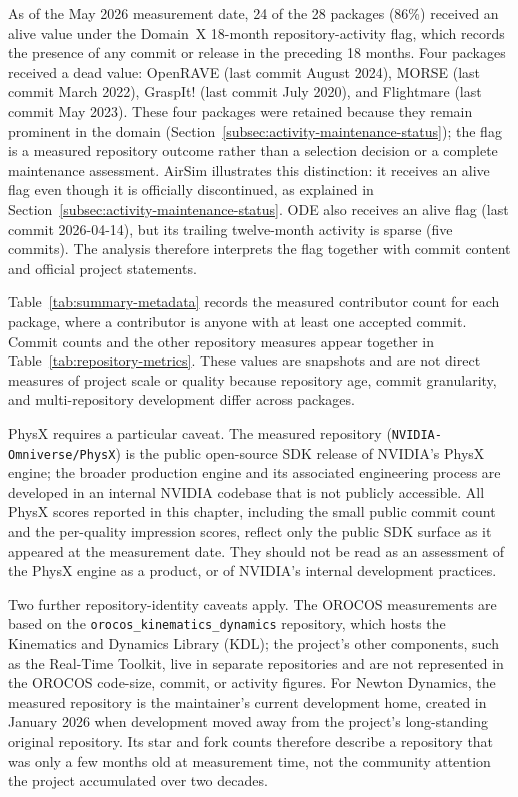 As of the May 2026 measurement date, 24 of the 28 packages (86\%) received an alive value under the Domain~X 18-month repository-activity flag, which records the presence of any commit or release in the preceding 18 months. Four packages received a dead value: OpenRAVE (last commit August 2024), MORSE (last commit March 2022), GraspIt! (last commit July 2020), and Flightmare (last commit May 2023). These four packages were retained because they remain prominent in the domain (Section~\ref{subsec:activity-maintenance-status}); the flag is a measured repository outcome rather than a selection decision or a complete maintenance assessment. AirSim illustrates this distinction: it receives an alive flag even though it is officially discontinued, as explained in Section~\ref{subsec:activity-maintenance-status}. ODE also receives an alive flag (last commit 2026-04-14), but its trailing twelve-month activity is sparse (five commits). The analysis therefore interprets the flag together with commit content and official project statements.

Table~\ref{tab:summary-metadata} records the measured contributor count for each package, where a contributor is anyone with at least one accepted commit. Commit counts and the other repository measures appear together in Table~\ref{tab:repository-metrics}. These values are snapshots and are not direct measures of project scale or quality because repository age, commit granularity, and multi-repository development differ across packages.

PhysX requires a particular caveat. The measured repository (\texttt{NVIDIA-\allowbreak Omniverse/\allowbreak PhysX}) is the public open-source SDK release of NVIDIA's PhysX engine; the broader production engine and its associated engineering process are developed in an internal NVIDIA codebase that is not publicly accessible. All PhysX scores reported in this chapter, including the small public commit count and the per-quality impression scores, reflect only the public SDK surface as it appeared at the measurement date. They should not be read as an assessment of the PhysX engine as a product, or of NVIDIA's internal development practices.

Two further repository-identity caveats apply. The OROCOS measurements are based on the \texttt{orocos\_kinematics\_dynamics} repository, which hosts the Kinematics and Dynamics Library (KDL); the project's other components, such as the Real-Time Toolkit, live in separate repositories and are not represented in the OROCOS code-size, commit, or activity figures. For Newton Dynamics, the measured repository is the maintainer's current development home, created in January 2026 when development moved away from the project's long-standing original repository. Its star and fork counts therefore describe a repository that was only a few months old at measurement time, not the community attention the project accumulated over two decades.

